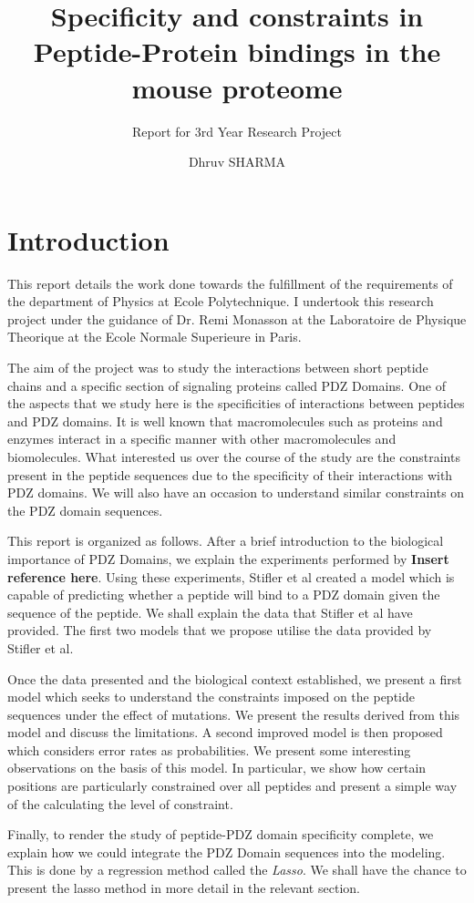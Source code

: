 \documentclass[a4paper, 12pt]{article}
\title{Specificity and constraints in Peptide-Protein bindings in the mouse proteome}
\subtitle{Report for 3rd Year Research Project}
\author{Dhruv SHARMA}
\begin{document}
\pagebreak
\maketitle
\tableofcontents
\pagebreak
\part{Introduction}
	This report details the work done towards the fulfillment of the requirements of the department of Physics at Ecole Polytechnique. I undertook this research project under the guidance of Dr. Remi Monasson at the Laboratoire de Physique Theorique at the Ecole Normale Superieure in Paris.

	\indent
	The aim of the project was to study the interactions between short peptide chains and a specific section of signaling proteins called PDZ Domains. One of the aspects that we study here is the specificities of interactions between peptides and PDZ domains. It is well known that macromolecules such as proteins and enzymes interact in a specific manner with other macromolecules and biomolecules. What interested us over the course of the study are the constraints present in the peptide sequences due to the specificity of their interactions with PDZ domains. We will also have an occasion to understand similar constraints on the PDZ domain sequences. 

	This report is organized as follows. After a brief introduction to the biological importance of PDZ Domains, we explain the experiments performed by \textbf{Insert reference here}. Using these experiments, Stifler et al created a model which is capable of predicting whether a peptide will bind to a PDZ domain given the sequence of the peptide. We shall explain the data that Stifler et al have provided. The first two models that we propose utilise the data provided by Stifler et al. 

	Once the data presented and the biological context established, we present a first model which seeks to understand the constraints imposed on the peptide sequences under the effect of mutations. We present the results derived from this model and discuss the limitations. A second improved model is then proposed which considers error rates as probabilities. We present some interesting observations on the basis of this model. In particular, we show how certain positions are particularly constrained over all peptides and present a simple way of the calculating the level of constraint. 

	Finally, to render the study of peptide-PDZ domain specificity complete, we explain how we could integrate the PDZ Domain sequences into the modeling. This is done by a regression method called the \textit{Lasso}. We shall have the chance to present the lasso method in more detail in the relevant section. 
\end{document}
